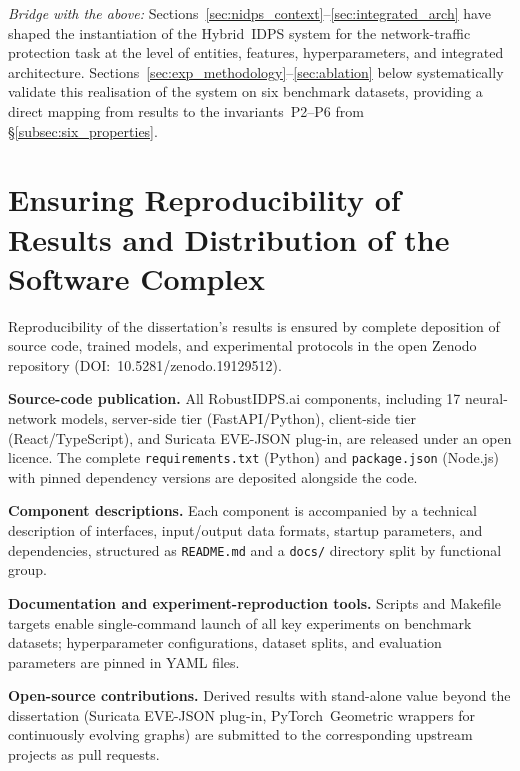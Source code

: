 \medskip
\noindent\emph{Bridge with the above:}
Sections~\ref{sec:nidps_context}--\ref{sec:integrated_arch}
have shaped the instantiation of the Hybrid~IDPS system for the
network-traffic protection task at the level of entities, features,
hyperparameters, and integrated architecture.
Sections~\ref{sec:exp_methodology}--\ref{sec:ablation} below
systematically validate this realisation of the system on six
benchmark datasets, providing a direct mapping from results to the
invariants~P2--P6 from \S\ref{subsec:six_properties}.


\section{Ensuring Reproducibility of Results and Distribution of the Software Complex}
\label{sec:reproducibility}

Reproducibility of the dissertation's results is ensured by complete
deposition of source code, trained models, and experimental protocols in
the open Zenodo repository (DOI:~10.5281/zenodo.19129512).

\textbf{Source-code publication.} All RobustIDPS.ai components, including
17 neural-network models, server-side tier (FastAPI/Python), client-side
tier (React/TypeScript), and Suricata EVE-JSON plug-in, are released under
an open licence. The complete \texttt{requirements.txt} (Python) and
\texttt{package.json} (Node.js) with pinned dependency versions are
deposited alongside the code.

\textbf{Component descriptions.} Each component is accompanied by a
technical description of interfaces, input/output data formats, startup
parameters, and dependencies, structured as \texttt{README.md} and a
\texttt{docs/} directory split by functional group.

\textbf{Documentation and experiment-reproduction tools.} Scripts and
Makefile targets enable single-command launch of all key experiments on
benchmark datasets; hyperparameter configurations, dataset splits, and
evaluation parameters are pinned in YAML files.

\textbf{Open-source contributions.} Derived results with stand-alone value
beyond the dissertation (Suricata EVE-JSON plug-in, PyTorch~Geometric
wrappers for continuously evolving graphs) are submitted to the
corresponding upstream projects as pull requests.

